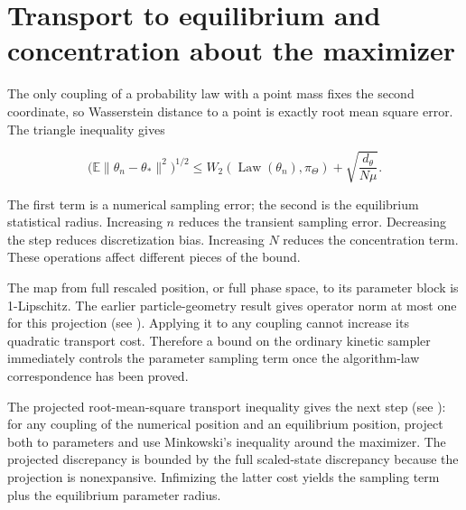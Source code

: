 \documentclass[11pt,a4paper]{report}
\begin{document}
\section{\texorpdfstring{Transport to equilibrium and concentration about the maximizer}{Transport to equilibrium and concentration about the maximizer}}


The only coupling of a probability law with a point mass fixes the second
coordinate, so Wasserstein distance to a point is exactly root mean square
error. The triangle inequality gives


\[\bigl(\mathbb E\|\theta_n-\theta_*\|^2\bigr)^{1/2}
\le W_2(\operatorname{Law}(\theta_n),\pi_\Theta)
+\sqrt{\frac{d_\theta}{N\mu}}.\]


The first term is a numerical sampling error; the second is the equilibrium
statistical radius. Increasing \(n\) reduces the transient sampling error.
Decreasing the step reduces discretization bias. Increasing \(N\) reduces
the concentration term. These operations affect different pieces of the bound.




The map from full rescaled position, or full phase space, to its parameter
block is 1-Lipschitz. The earlier particle-geometry result gives operator norm at most one for this projection (see \cite[Section~3.1.6]{LangevinLean2026IPLA}). Applying it to any coupling cannot
increase its quadratic transport cost. Therefore a bound on the ordinary
kinetic sampler immediately controls the parameter sampling term once the
algorithm-law correspondence has been proved.



The projected root-mean-square transport inequality gives the next step (see \cite[Section~3.48.9]{LangevinLean2026ULASC}): for any coupling of the numerical position and an equilibrium position, project both to parameters and use Minkowski’s inequality around the maximizer. The projected discrepancy is bounded by the full scaled-state discrepancy because the projection is nonexpansive. Infimizing the latter cost yields the sampling term plus the equilibrium parameter radius.
\end{document}

